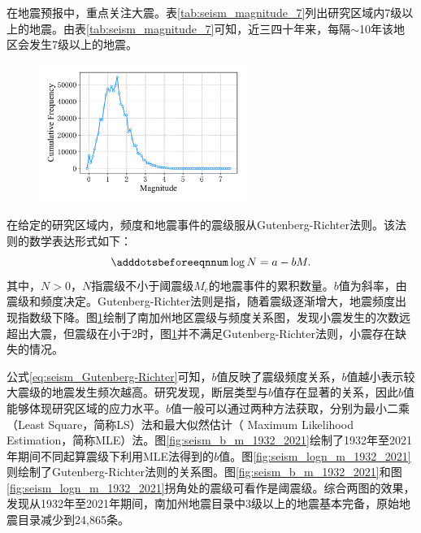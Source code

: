 在地震预报中，重点关注大震。表\ref{tab:seism_magnitude_7}列出研究区域内7级以上的地震。由表\ref{tab:seism_magnitude_7}可知，近三四十年来，每隔$\sim$10年该地区会发生7级以上的地震。

\begin{figure}[!htbp]
  \centering
  \includegraphics[width=0.60\textwidth]{Img/chap5_seism/seism_m_f.pdf}
  \vspace{-0.5cm}
  \label{fig:seism_m_f}
\end{figure}

在给定的研究区域内，频度和地震事件的震级服从Gutenberg-Richter法则\citep{Gutenberg1994Frequency,Panakkat2007Neural}。该法则的数学表达形式如下：
\begin{equation}\adddotsbeforeeqnnum
  \label{eq:seism_Gutenberg-Richter}
  \log N=a-bM.
\end{equation}
其中，$N>0$，$N$指震级不小于阈震级$M_c$的地震事件的累积数量。$b$值为斜率，由震级和频度决定。Gutenberg-Richter法则是指，随着震级逐渐增大，地震频度出现指数级下降\citep{Asim2018Earthquake}。图\ref{fig:seism_m_f}绘制了南加州地区震级与频度关系图，发现小震发生的次数远超出大震，但震级在小于2时，图\ref{fig:seism_m_f}并不满足Gutenberg-Richter法则，小震存在缺失的情况。

公式\ref{eq:seism_Gutenberg-Richter}可知，$b$值反映了震级频度关系，$b$值越小表示较大震级的地震发生频次越高。\citet{schorlemmer2005variations}研究发现，断层类型与$b$值存在显著的关系，因此$b$值能够体现研究区域的应力水平。$b$值一般可以通过两种方法获取，分别为最小二乘（Least Square，简称LS）法和最大似然估计（ Maximum Likelihood Estimation，简称MLE）法。图\ref{fig:seism_b_m_1932_2021}绘制了1932年至2021年期间不同起算震级下利用MLE法得到的$b$值。图\ref{fig:seism_logn_m_1932_2021}则绘制了Gutenberg-Richter法则的关系图。图\ref{fig:seism_b_m_1932_2021}和图\ref{fig:seism_logn_m_1932_2021}拐角处的震级可看作是阈震级。综合两图的效果，发现从1932年至2021年期间，南加州地震目录中3级以上的地震基本完备，原始地震目录减少到24,865条。

